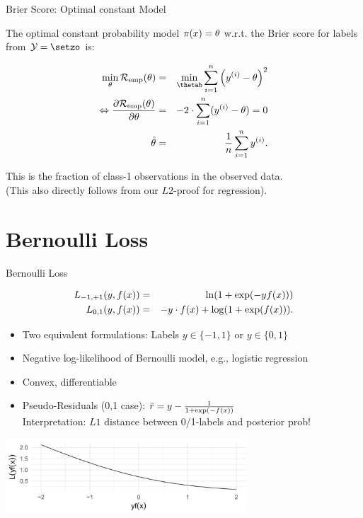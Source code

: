 \begin{vbframe}{Brier Score: Optimal constant Model}

The optimal constant probability model $\pi(x) = \theta$ w.r.t. the Brier score for labels from $\Yspace = \setzo$ is:

\begin{eqnarray*}
  \min_{\theta} \riske(\theta) &=& \min_{\thetab} \sumin \left(\yi - \theta\right)^2 \\
  \Leftrightarrow \frac{\partial \riske(\theta)}{\partial \theta} &=& - 2 \cdot \sumin (\yi - \theta) = 0 \\
  \hat \theta &=& \frac{1}{n} \sumin \yi.   
\end{eqnarray*}

This is the fraction of class-1 observations in the observed data.\\
(This also directly follows from our $L2$-proof for regression).

\end{vbframe}


\section{Bernoulli Loss}

\begin{vbframe}{Bernoulli Loss}

\vspace*{-0.5cm}
\begin{eqnarray*}
  L_{-1, +1}(y, f(x)) &=& \ln(1+\exp(-yf(x))) \\
  L_{0, 1}(y, f(x)) &=& - y \cdot f(x) + \log(1 + \exp(f(x))). 
\end{eqnarray*}

\begin{itemize}
  \item Two equivalent formulations: Labels $y \in \{-1, 1\}$ or $y \in \{0, 1\}$
  \item Negative log-likelihood of Bernoulli model, e.g., logistic regression
  \item Convex, differentiable
  \item Pseudo-Residuals (0,1 case): $\tilde{r} = y - \frac{1}{1+\exp(-f(x))}$\\   
    Interpretation: $L1$ distance between 0/1-labels and posterior prob!
\end{itemize}

\vspace{0.2cm}
\begin{center}
\includegraphics[width = 9cm ]{figure_man/bernoulli.png} \\
\end{center}

\end{vbframe}


